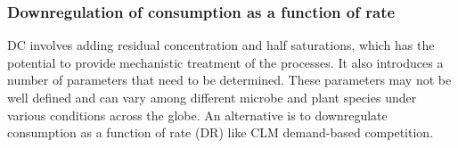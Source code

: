 \documentclass[gmd, manuscript]{copernicus}
\begin{document}

\subsubsection{Downregulation of consumption as a function of rate}
DC involves adding residual concentration and half saturations, which has the
potential to provide mechanistic treatment of the processes. It also introduces
a number of parameters that need to be determined. These parameters may not be
well defined and can vary among different microbe and plant species under
various conditions across the globe. 
An alternative is to downregulate consumption as a function of rate (DR) like
CLM demand-based competition. 
\end{document}
